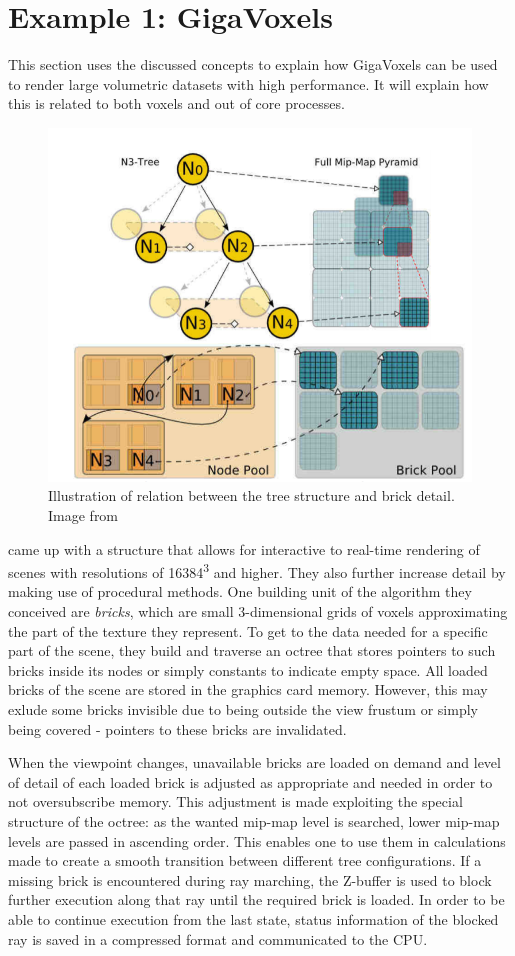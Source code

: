 \section{Example 1: GigaVoxels}

This section uses the discussed concepts to explain how GigaVoxels can be used to render large volumetric datasets with high performance. It will explain how this is related to both voxels and out of core processes.

\begin{figure}[h]
  \begin{center}
    \includegraphics[width=.4\textwidth]{logos/gigavoxels_structure.png}
    \caption{Illustration of relation between the tree structure and brick detail. Image from \cite{Crassin:2009:GRS:1507149.1507152}}
  \end{center}
\end{figure}

\cite{Crassin:2009:GRS:1507149.1507152} came up with a structure that allows for interactive to real-time rendering of scenes with resolutions of 16384\textsuperscript{3} and higher. They also further increase detail by making use of procedural methods. One building unit of the algorithm they conceived are \textit{bricks}, which are small 3-dimensional grids of voxels approximating the part of the texture they represent. To get to the data needed for a specific part of the scene, they build and traverse an octree that stores pointers to such bricks inside its nodes or simply constants to indicate empty space. All loaded bricks of the scene are stored in the graphics card memory. However, this may exlude some bricks invisible due to being outside the view frustum or simply being covered - pointers to these bricks are invalidated. 

When the viewpoint changes, unavailable bricks are loaded on demand and level of detail of each loaded brick is adjusted as appropriate and needed in order to not oversubscribe memory. This adjustment is made exploiting the special structure of the octree: as the wanted mip-map level is searched, lower mip-map levels are passed in ascending order. This enables one to use them in calculations made to create a smooth transition between different tree configurations. If a missing brick is encountered during ray marching, the Z-buffer is used to block further execution along that ray until the required brick is loaded. In order to be able to continue execution from the last state, status information of the blocked ray is saved in a compressed format and communicated to the CPU.


